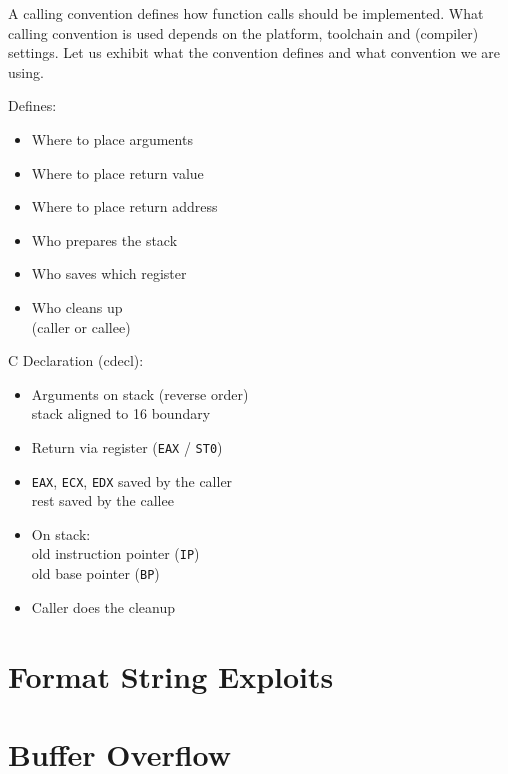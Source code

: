 \documentclass[article]{uibk}
\begin{document}
A calling convention defines how function calls should be implemented. What
calling convention is used depends on the platform, toolchain and (compiler)
settings. Let us exhibit what the convention defines and what convention we are
using.

\begin{minipage}[t]{0.47\textwidth}
    Defines:
    \begin{itemize}
        \item Where to place arguments
        \item Where to place return value
        \item Where to place return address
        \item Who prepares the stack
        \item Who saves which register
        \item Who cleans up\\
            (caller or callee)
    \end{itemize}
\end{minipage}
\begin{minipage}[t]{0.47\textwidth}
    C Declaration (cdecl):
    \begin{itemize}
        \item Arguments on stack (reverse order)\\
            stack aligned to \SI{16}{\byte} boundary
        \item Return via register (\texttt{EAX} / \texttt{ST0})
        \item \texttt{EAX}, \texttt{ECX}, \texttt{EDX} saved by the caller\\
            rest saved by the callee
        \item On stack:\\
            old instruction pointer (\texttt{IP})\\
            old base pointer (\texttt{BP})
        \item Caller does the cleanup
    \end{itemize}
\end{minipage}

\newpage

\section{Format String Exploits}

\section{Buffer Overflow}
\end{document}
